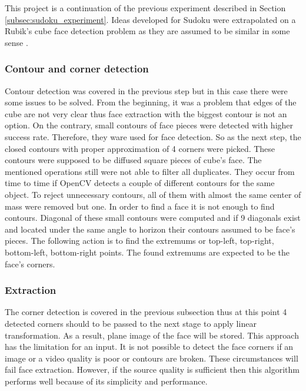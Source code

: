 \documentclass[../../main]{subfiles}
\begin{document}
This project is a continuation of the previous experiment described in Section \ref{subsec:sudoku_experiment}. Ideas developed for Sudoku were extrapolated on a Rubik's cube face detection problem as they are assumed to be similar in some sense \cite{rubiks_cube_zakharov}.

\subsubsection{Contour and corner detection}

Contour detection was covered in the previous step but in this case there were some issues to be solved. From the beginning, it was a problem that edges of the cube are not very clear thus face extraction with the biggest contour is not an option. On the contrary, small contours of face pieces were detected with higher success rate. Therefore, they ware used for face detection. So as the next step, the closed contours with proper approximation of 4 corners were picked. These contours were supposed to be diffused square pieces of cube's face. The mentioned operations still were not able to filter all duplicates. They occur from time to time if \ac{OpenCV} detects a couple of different contours for the same object. To reject unnecessary contours, all of them with almost the same center of mass were removed but one. In order to find a face it is not enough to find contours. Diagonal of these small contours were computed and if 9 diagonals exist and located under the same angle to horizon their contours assumed to be face's pieces. The following action is to find the extremums or top-left, top-right, bottom-left, bottom-right points. The found extremums are expected to be the face's corners.

\subsubsection{Extraction}

The corner detection is covered in the previous subsection thus at this point 4 detected corners should to be passed to the next stage to apply linear transformation. As a result, plane image of the face will be stored.
This approach has the limitation for an input. It is not possible to detect the face corners if an image or a video quality is poor or contours are broken. These circumstances will fail face extraction. However, if the source quality is sufficient then this algorithm performs well because of its simplicity and performance.
\end{document}
